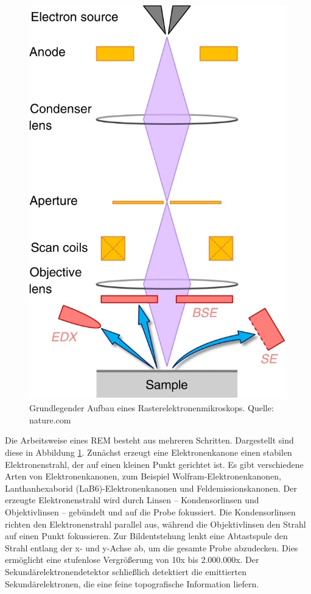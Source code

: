 \begin{figure}
    \centering
    \includegraphics[width=\linewidth]{img/SEM.jpg}
    \caption{Grundlegender Aufbau eines Rasterelektronenmikroskops. Quelle: nature.com \cite{Shah.2019}}
    \label{fig:sem}
\end{figure}
Die Arbeitsweise eines REM besteht aus mehreren Schritten. Dargestellt sind diese in Abbildung \ref{fig:sem}. Zunächst erzeugt eine Elektronenkanone einen stabilen Elektronenstrahl, der auf einen kleinen Punkt gerichtet ist. Es gibt verschiedene Arten von Elektronenkanonen, zum Beispiel Wolfram-Elektronenkanonen, Lanthanhexaborid (LaB6)-Elektronenkanonen und Feldemissionskanonen. Der erzeugte Elektronenstrahl wird durch Linsen – Kondensorlinsen und Objektivlinsen – gebündelt und auf die Probe fokussiert. Die Kondensorlinsen richten den Elektronenstrahl parallel aus, während die Objektivlinsen den Strahl auf einen Punkt fokussieren. Zur Bildentstehung lenkt eine Abtastspule den Strahl entlang der x- und y-Achse ab, um die gesamte Probe abzudecken. Dies ermöglicht eine stufenlose Vergrößerung von 10x bis 2.000.000x. Der Sekundärelektronendetektor schließlich detektiert die emittierten Sekundärelektronen, die eine feine topografische Information liefern.

